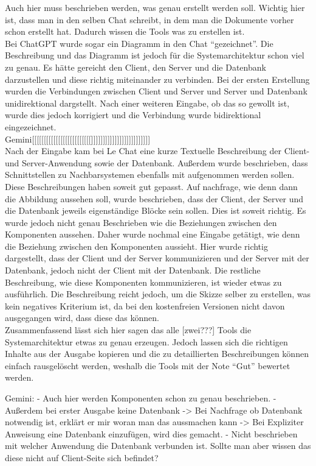 Auch hier muss beschrieben werden, was genau erstellt werden soll. Wichtig hier ist, dass man in den selben Chat schreibt, in dem man die Dokumente vorher
schon erstellt hat. Dadurch wissen die Tools was zu erstellen ist.\\
Bei ChatGPT wurde sogar ein Diagramm in den Chat ``gezeichnet''. Die Beschreibung und das Diagramm ist jedoch für die Systemarchitektur schon viel zu genau.
Es hätte gereicht den Client, den Server und die Datenbank darzustellen und diese richtig miteinander zu verbinden. Bei der ersten Erstellung wurden 
die Verbindungen zwischen Client und Server und Server und Datenbank unidirektional dargstellt. Nach einer weiteren Eingabe, ob das so gewollt ist, wurde 
dies jedoch korrigiert und die Verbindung wurde bidirektional eingezeichnet.\\
Gemini[[[[[[[[[[[[[[[[[[[[[[[[[]]]]]]]]]]]]]]]]]]]]]]]]]\\
Nach der Eingabe kam bei Le Chat eine kurze Textuelle Beschreibung der Client- und Server-Anwendung sowie der Datenbank. Außerdem wurde beschrieben, 
dass Schnittstellen zu Nachbarsystemen ebenfalls mit aufgenommen werden sollen. Diese Beschreibungen haben soweit gut gepasst. Auf nachfrage, wie denn 
dann die Abbildung aussehen soll, wurde beschrieben, dass der Client, der Server und die Datenbank jeweils eigenständige Blöcke sein sollen. Dies ist soweit
richtig. Es wurde jedoch nicht genau Beschrieben wie die Beziehungen zwischen den Komponenten aussehen. Daher wurde nochmal eine Eingabe getätigt, wie denn 
die Beziehung zwischen den Komponenten aussieht. Hier wurde richtig dargestellt, dass der Client und der Server kommunizieren und der Server mit der Datenbank, 
jedoch nicht der Client mit der Datenbank. Die restliche Beschreibung, wie diese Komponenten kommunizieren, ist wieder etwas zu ausführlich. Die Beschreibung 
reicht jedoch, um die Skizze selber zu erstellen, was kein negatives Kriterium ist, da bei den kostenfreien Versionen nicht davon ausgegangen wird, dass diese 
das können.\\

Zusammenfassend lässt sich hier sagen das alle [zwei???] Tools die Systemarchitektur etwas zu genau erzeugen. Jedoch lassen sich die richtigen Inhalte 
aus der Ausgabe kopieren und die zu detaillierten Beschreibungen können einfach rausgelöscht werden, weshalb die Tools mit der Note ``Gut'' bewertet werden.


Gemini:
    - Auch hier werden Komponenten schon zu genau beschrieben.
    - Außerdem bei erster Ausgabe keine Datenbank -> Bei Nachfrage ob Datenbank notwendig ist, erklärt er mir woran man das aussmachen 
    kann -> Bei Expliziter Anweisung eine Datenbank einzufügen, wird dies gemacht.
    - Nicht beschrieben mit welcher Anwendung die Datenbank verbunden ist. Sollte man aber wissen das diese nicht auf Client-Seite 
    sich befindet?




